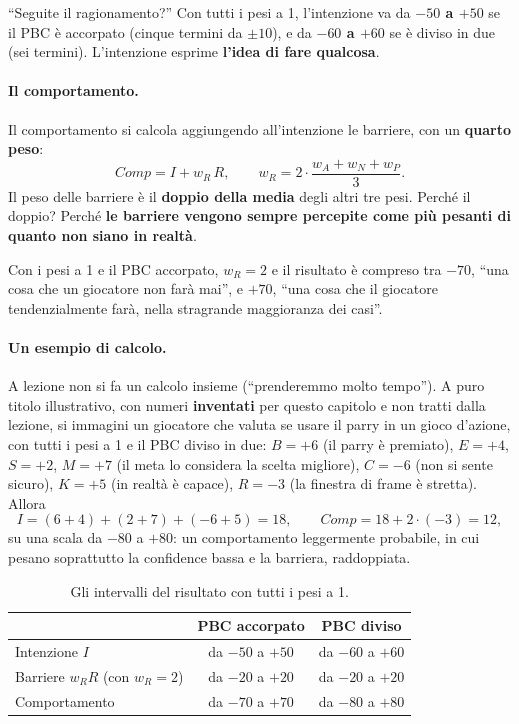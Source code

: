 ``Seguite il ragionamento?'' Con tutti i pesi a 1, l'intenzione va da
\textbf{$-50$ a $+50$} se il PBC è accorpato (cinque termini da $\pm 10$), e
da \textbf{$-60$ a $+60$} se è diviso in due (sei termini). L'intenzione
esprime \textbf{l'idea di fare qualcosa}.

\paragraph{Il comportamento.} Il comportamento si calcola aggiungendo
all'intenzione le barriere, con un \textbf{quarto peso}:
\[
  \mathit{Comp} = I + w_R\,R,
  \qquad
  w_R = 2 \cdot \frac{w_A + w_N + w_P}{3}.
\]
Il peso delle barriere è il \textbf{doppio della media} degli altri tre pesi.
Perché il doppio? Perché \textbf{le barriere vengono sempre percepite come
più pesanti di quanto non siano in realtà}.

Con i pesi a 1 e il PBC accorpato, $w_R = 2$ e il risultato è compreso tra
\textbf{$-70$}, ``una cosa che un giocatore non farà mai'', e \textbf{$+70$},
``una cosa che il giocatore tendenzialmente farà, nella stragrande
maggioranza dei casi''.

\paragraph{Un esempio di calcolo.} A lezione non si fa un calcolo insieme
(``prenderemmo molto tempo''). A puro titolo illustrativo, con numeri
\textbf{inventati} per questo capitolo e non tratti dalla lezione, si
immagini un giocatore che valuta se usare il parry in un gioco d'azione, con
tutti i pesi a 1 e il PBC diviso in due: $B = +6$ (il parry è premiato),
$E = +4$, $S = +2$, $M = +7$ (il meta lo considera la scelta migliore),
$C = -6$ (non si sente sicuro), $K = +5$ (in realtà è capace), $R = -3$ (la
finestra di frame è stretta). Allora
\[
  I = (6 + 4) + (2 + 7) + (-6 + 5) = 18,
  \qquad
  \mathit{Comp} = 18 + 2 \cdot (-3) = 12,
\]
su una scala da $-80$ a $+80$: un comportamento leggermente probabile, in
cui pesano soprattutto la confidence bassa e la barriera, raddoppiata.

\begin{table}[htbp]
  \centering
  \caption{Gli intervalli del risultato con tutti i pesi a 1.}
  \label{gd9:tab:tpb-intervalli}
  \small
  \begin{tabular}{@{}lcc@{}}
    \toprule
    & \textbf{PBC accorpato} & \textbf{PBC diviso} \\
    \midrule
    Intenzione $I$ & da $-50$ a $+50$ & da $-60$ a $+60$ \\
    Barriere $w_R R$ (con $w_R = 2$) & da $-20$ a $+20$ & da $-20$ a $+20$ \\
    Comportamento & da $-70$ a $+70$ & da $-80$ a $+80$ \\
    \bottomrule
  \end{tabular}
\end{table}

